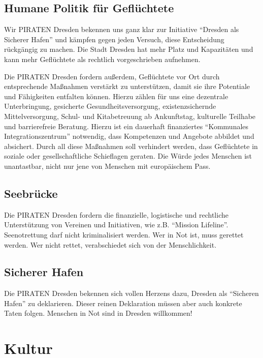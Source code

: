 \documentclass[a4paper, 11pt]{article}
\begin{document}
\subsection{Humane Politik für Geflüchtete}
Wir PIRATEN Dresden bekennen uns ganz klar zur Initiative ``Dresden als Sicherer Hafen'' und kämpfen gegen jeden Versuch, diese Entscheidung rückgängig zu machen. Die Stadt Dresden hat mehr Platz und Kapazitäten und kann mehr Geflüchtete als rechtlich vorgeschrieben aufnehmen.\newline

Die PIRATEN Dresden fordern außerdem, Geflüchtete vor Ort durch entsprechende Maßnahmen verstärkt zu unterstützen, damit sie ihre Potentiale und Fähigkeiten entfalten können. Hierzu zählen für uns eine dezentrale Unterbringung, gesicherte Gesundheitsversorgung, existenzsichernde Mittelversorgung, Schul- und Kitabetreuung ab Ankunftstag, kulturelle Teilhabe und barrierefreie Beratung. Hierzu ist ein dauerhaft finanziertes ``Kommunales Integrationszentrum'' notwendig, dass Kompetenzen und Angebote abbildet und absichert. Durch all diese Maßnahmen soll verhindert werden, dass Geflüchtete in soziale oder gesellschaftliche Schieflagen geraten. Die Würde jedes Menschen ist unantastbar, nicht nur jene von Menschen mit europäischem Pass.








\subsection{Seebrücke}
Die PIRATEN Dresden fordern die finanzielle, logistische und rechtliche Unterstützung von Vereinen und Initiativen, wie z.B. ``Mission Lifeline''. Seenotrettung darf nicht kriminalisiert werden. Wer in Not ist, muss gerettet werden. Wer nicht rettet, verabschiedet sich von der Menschlichkeit.


\subsection{Sicherer Hafen}
Die PIRATEN Dresden bekennen sich vollen Herzens dazu, Dresden als ``Sicheren Hafen'' zu deklarieren. Dieser reinen Deklaration müssen aber auch konkrete Taten folgen. Menschen in Not sind in Dresden willkommen!


\section{Kultur}
\end{document}
